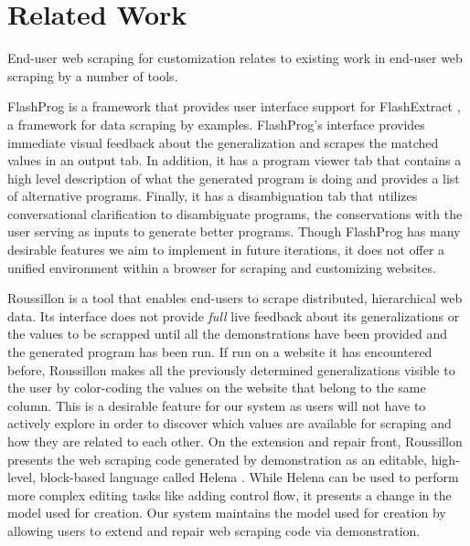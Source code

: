 \documentclass[sigconf,10pt]{acmart}
\begin{document}
\hypertarget{sec:related-work}{%
\section{Related Work}\label{sec:related-work}}

End-user web scraping for customization relates to existing work in
end-user web scraping by a number of tools.

FlashProg \citep{mayer2015} is a framework that provides user interface
support for FlashExtract \citep{le2014}, a framework for data scraping
by examples. FlashProg's interface provides immediate visual feedback
about the generalization and scrapes the matched values in an output
tab. In addition, it has a program viewer tab that contains a high level
description of what the generated program is doing and provides a list
of alternative programs. Finally, it has a disambiguation tab that
utilizes conversational clarification to disambiguate programs, the
conservations with the user serving as inputs to generate better
programs. Though FlashProg has many desirable features we aim to
implement in future iterations, it does not offer a unified environment
within a browser for scraping and customizing websites.

Roussillon \citep{chasins2018} is a tool that enables end-users to
scrape distributed, hierarchical web data. Its interface does not
provide \emph{full} live feedback about its generalizations or the
values to be scrapped until all the demonstrations have been provided
and the generated program has been run. If run on a website it has
encountered before, Roussillon makes all the previously determined
generalizations visible to the user by color-coding the values on the
website that belong to the same column. This is a desirable feature for
our system as users will not have to actively explore in order to
discover which values are available for scraping and how they are
related to each other. On the extension and repair front, Roussillon
presents the web scraping code generated by demonstration as an
editable, high-level, block-based language called Helena
\citep{zotero-51}. While Helena can be used to perform more complex
editing tasks like adding control flow, it presents a change in the
model used for creation. Our system maintains the model used for
creation by allowing users to extend and repair web scraping code via
demonstration.
\end{document}
